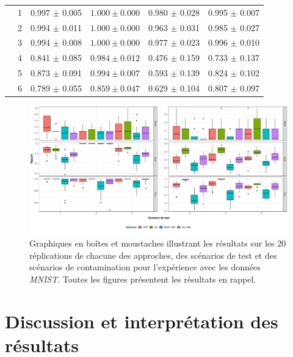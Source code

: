 \begin{table}[h]
\begin{tabular}{|c|c|c c c c|}
		& 1 & 0.997 $\pm$ 0.005 & $\mathbf{1.000 \pm 0.000}$ & 0.980 $\pm$ 0.028 & 0.995 $\pm$ 0.007  \\
		& 2 & 0.994 $\pm$ 0.011 & $\mathbf{1.000 \pm 0.000}$ & 0.963 $\pm$ 0.031 & 0.985 $\pm$ 0.027  \\
		& 3 & 0.994 $\pm$ 0.008 & $\mathbf{1.000 \pm 0.000}$ & 0.977 $\pm$ 0.023 & 0.996 $\pm$ 0.010  \\
		& 4 & 0.841 $\pm$ 0.085 & $\mathbf{0.984 \pm 0.012}$ & 0.476 $\pm$ 0.159 & 0.733 $\pm$ 0.137  \\			
		& 5 & 0.873 $\pm$ 0.091 & $\mathbf{0.994 \pm 0.007}$ & 0.593 $\pm$ 0.139 & 0.824 $\pm$ 0.102  \\
		& 6 & 0.789 $\pm$ 0.055 & $\mathbf{0.859 \pm 0.047}$ & 0.629 $\pm$ 0.104 & 0.807 $\pm$ 0.097  \\
		\midrule
	\end{tabular} 
	\label{tab:recall_mnist}
\end{table}

\begin{figure}[H]
	\centering
	\includegraphics[width=\linewidth]{images/images_boxplots/recall_mnist.pdf}
	\DIFdelbeginFL %
\DIFdelendFL \DIFaddbeginFL \caption[Graphiques en boîtes et moustaches illustrant les résultats de rappel pour les données \textit{MNIST}.]{\DIFaddendFL Graphiques en boîtes et moustaches illustrant les résultats sur les 20 réplications de chacune des approches, des scénarios de test et des scénarios de contamination pour l'expérience avec les données \textit{MNIST}. Toutes les figures présentent les résultats en rappel.}
	\label{fig:recall_mnist}
\end{figure}

\section{Discussion et interprétation des résultats} \label{discussion}

